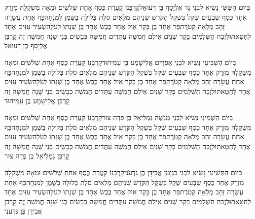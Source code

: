 \documentclass[../main/main.tex]{subfiles}
\begin{document}
\begin{multicols}{\ncols}
בַּיּוֹם הַשִּׁשִּׁי נָשִׂיא לִבְנֵי גָד אֶלְיָסָף בֶּן דְּעוּאֵל\PreVerseSpace{}קָרְבָּנוֹ קַעֲרַת כֶּסֶף אַחַת שְׁלֹשִׁים וּמֵאָה מִשְׁקָלָהּ מִזְרָק אֶחָד כֶּסֶף שִׁבְעִים שֶׁקֶל בְּשֶׁקֶל הַקֹּדֶשׁ שְׁנֵיהֶם מְלֵאִים סֹלֶת בְּלוּלָה בַשֶּׁמֶן לְמִנְחָה\PreVerseSpace{}כַּף אַחַת עֲשָׂרָה זָהָב מְלֵאָה קְטֹרֶת\PreVerseSpace{}פַּר אֶחָד בֶּן בָּקָר אַיִל אֶחָד כֶּבֶשׂ אֶחָד בֶּן שְׁנָתוֹ לְעֹלָה\PreVerseSpace{}שְׂעִיר עִזִּים אֶחָד לְחַטָּאת\PreVerseSpace{}וּלְזֶבַח הַשְּׁלָמִים בָּקָר שְׁנַיִם אֵילִם חֲמִשָּׁה עַתֻּדִים חֲמִשָּׁה כְּבָשִׂים בְּנֵי שָׁנָה חֲמִשָּׁה זֶה קָרְבַּן אֶלְיָסָף בֶּן דְּעוּאֵל\OpenSection{}\par
{}בַּיּוֹם הַשְּׁבִיעִי נָשִׂיא לִבְנֵי אֶפְרָיִם אֱלִישָׁמָע בֶּן עַמִּיהוּד\PreVerseSpace{}קָרְבָּנוֹ קַעֲרַת כֶּסֶף אַחַת שְׁלֹשִׁים וּמֵאָה מִשְׁקָלָהּ מִזְרָק אֶחָד כֶּסֶף שִׁבְעִים שֶׁקֶל בְּשֶׁקֶל הַקֹּדֶשׁ שְׁנֵיהֶם מְלֵאִים סֹלֶת בְּלוּלָה בַשֶּׁמֶן לְמִנְחָה\PreVerseSpace{}כַּף אַחַת עֲשָׂרָה זָהָב מְלֵאָה קְטֹרֶת\PreVerseSpace{}פַּר אֶחָד בֶּן בָּקָר אַיִל אֶחָד כֶּבֶשׂ אֶחָד בֶּן שְׁנָתוֹ לְעֹלָה\PreVerseSpace{}שְׂעִיר עִזִּים אֶחָד לְחַטָּאת\PreVerseSpace{}וּלְזֶבַח הַשְּׁלָמִים בָּקָר שְׁנַיִם אֵילִם חֲמִשָּׁה עַתֻּדִים חֲמִשָּׁה כְּבָשִׂים בְּנֵי שָׁנָה חֲמִשָּׁה זֶה קָרְבַּן אֱלִישָׁמָע בֶּן עַמִּיהוּד\OpenSection{}\par
{}בַּיּוֹם הַשְּׁמִינִי נָשִׂיא לִבְנֵי מְנַשֶּׁה גַּמְלִיאֵל בֶּן פְּדָה צוּר\PreVerseSpace{}קָרְבָּנוֹ קַעֲרַת כֶּסֶף אַחַת שְׁלֹשִׁים וּמֵאָה מִשְׁקָלָהּ מִזְרָק אֶחָד כֶּסֶף שִׁבְעִים שֶׁקֶל בְּשֶׁקֶל הַקֹּדֶשׁ שְׁנֵיהֶם מְלֵאִים סֹלֶת בְּלוּלָה בַשֶּׁמֶן לְמִנְחָה\PreVerseSpace{}כַּף אַחַת עֲשָׂרָה זָהָב מְלֵאָה קְטֹרֶת\PreVerseSpace{}פַּר אֶחָד בֶּן בָּקָר אַיִל אֶחָד כֶּבֶשׂ אֶחָד בֶּן שְׁנָתוֹ לְעֹלָה\PreVerseSpace{}שְׂעִיר עִזִּים אֶחָד לְחַטָּאת\PreVerseSpace{}וּלְזֶבַח הַשְּׁלָמִים בָּקָר שְׁנַיִם אֵילִם חֲמִשָּׁה עַתֻּדִים חֲמִשָּׁה כְּבָשִׂים בְּנֵי שָׁנָה חֲמִשָּׁה זֶה קָרְבַּן גַּמְלִיאֵל בֶּן פְּדָה צוּר\OpenSection{}\par
{}בַּיּוֹם הַתְּשִׁיעִי נָשִׂיא לִבְנֵי בִנְיָמִן אֲבִידָן בֶּן גִּדְעֹנִי\PreVerseSpace{}קָרְבָּנוֹ קַעֲרַת כֶּסֶף אַחַת שְׁלֹשִׁים וּמֵאָה מִשְׁקָלָהּ מִזְרָק אֶחָד כֶּסֶף שִׁבְעִים שֶׁקֶל בְּשֶׁקֶל הַקֹּדֶשׁ שְׁנֵיהֶם מְלֵאִים סֹלֶת בְּלוּלָה בַשֶּׁמֶן לְמִנְחָה\PreVerseSpace{}כַּף אַחַת עֲשָׂרָה זָהָב מְלֵאָה קְטֹרֶת\PreVerseSpace{}פַּר אֶחָד בֶּן בָּקָר אַיִל אֶחָד כֶּבֶשׂ אֶחָד בֶּן שְׁנָתוֹ לְעֹלָה\PreVerseSpace{}שְׂעִיר עִזִּים אֶחָד לְחַטָּאת\PreVerseSpace{}וּלְזֶבַח הַשְּׁלָמִים בָּקָר שְׁנַיִם אֵילִם חֲמִשָּׁה עַתֻּדִים חֲמִשָּׁה כְּבָשִׂים בְּנֵי שָׁנָה חֲמִשָּׁה זֶה קָרְבַּן אֲבִידָן בֶּן גִּדְעֹנִי\OpenSection{}\par

\end{multicols}
\end{document}
